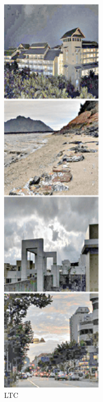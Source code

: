 \documentclass[CJK,aspectratio=169]{beamer}  %
\begin{document}
\begin{frame}
\begin{figure}
\begin{minipage}{.08\paperwidth}
			\label{fig: LTC}	
			\caption*{\tiny LTC}
		\end{minipage}
		\begin{minipage}{.08\paperwidth}
			\centering
			\setlength{\abovecaptionskip}{-0.45cm}
			\includegraphics[width=\linewidth]{picture/LLIE/LightingNet/MSR}

\end{minipage}
\end{figure}
\end{frame}
\end{document}
